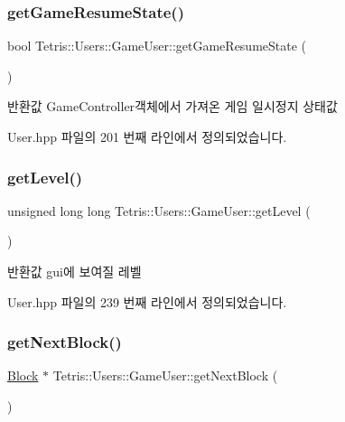 \subsubsection{\texorpdfstring{get\+Game\+Resume\+State()}{getGameResumeState()}}
{\footnotesize\ttfamily bool Tetris\+::\+Users\+::\+Game\+User\+::get\+Game\+Resume\+State (\begin{DoxyParamCaption}{ }\end{DoxyParamCaption})\hspace{0.3cm}{\ttfamily [inline]}}

\begin{DoxyReturn}{반환값}
Game\+Controller객체에서 가져온 게임 일시정지 상태값 
\end{DoxyReturn}


User.\+hpp 파일의 201 번째 라인에서 정의되었습니다.

\mbox{\label{class_tetris_1_1_users_1_1_game_user_ae052e17a9bdcb0d8bc98c287592f7d7b}} 
\subsubsection{\texorpdfstring{get\+Level()}{getLevel()}}
{\footnotesize\ttfamily unsigned long long Tetris\+::\+Users\+::\+Game\+User\+::get\+Level (\begin{DoxyParamCaption}{ }\end{DoxyParamCaption})\hspace{0.3cm}{\ttfamily [inline]}}

\begin{DoxyReturn}{반환값}
gui에 보여질 레벨 
\end{DoxyReturn}


User.\+hpp 파일의 239 번째 라인에서 정의되었습니다.

\mbox{\label{class_tetris_1_1_users_1_1_game_user_a9300608a38f8a3b10f9d6b6bdaeaab18}} 
\subsubsection{\texorpdfstring{get\+Next\+Block()}{getNextBlock()}\hspace{0.1cm}{\footnotesize\ttfamily [1/2]}}
{\footnotesize\ttfamily \hyperlink{class_tetris_1_1_block}{Block} $\ast$ Tetris\+::\+Users\+::\+Game\+User\+::get\+Next\+Block (\begin{DoxyParamCaption}{ }\end{DoxyParamCaption})}



